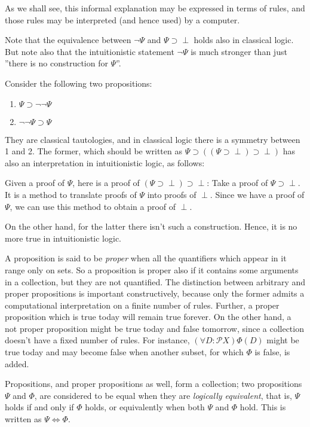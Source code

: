 As we shall see, this informal explanation may be expressed in terms of rules, and those rules may be interpreted (and hence used) by a computer.

Note that the equivalence between $\neg\Psi$ and $\Psi\supset\perp$ holds also in classical logic. But note also that the intuitionistic statement $\neg\Psi$ is much stronger than just ''there is no construction for $\Psi$''.
\begin{example}
	Consider the following two propositions:
	\begin{enumerate}
		\item $\Psi\supset\neg\neg\Psi$
		\item $\neg\neg\Psi\supset\Psi$
	\end{enumerate}
	They are classical tautologies, and in classical logic there is a symmetry between 1 and 2. The former, which should be written as $\Psi\supset((\Psi\supset\perp)\supset\perp)$ has also an interpretation in intuitionistic logic, as follows:
	\begin{center}
		Given a proof of $\Psi$, here is a proof of $(\Psi\supset\perp)\supset\perp$: Take a proof of $\Psi\supset\perp$. It is a method to translate proofs of $\Psi$ into proofs of $\perp$. Since we have a proof of $\Psi$, we can use this method to obtain a proof of $\perp$.
	\end{center}
	On the other hand, for the latter there isn't such a construction. Hence, it is no more true in intuitionistic logic.
\end{example}


A proposition is said to be \textit{proper} when all the quantifiers which appear in it range only on sets. So a proposition is proper also if it contains some arguments in a collection, but they are not quantified. The distinction between arbitrary and proper propositions is important constructively, because only the former admits a computational interpretation on a finite number of rules. Further, a proper proposition which is true today will remain true forever. On the other hand, a not proper proposition might be true today and false tomorrow, since a collection doesn't have a fixed number of rules. For instance, $(\forall D : \mathcal{P}X)\Phi(D)$ might be true today and may become false when another subset, for which $\Phi$ is false, is added.

Propositions, and proper propositions as well, form a collection; two propositions $\Psi$ and $\Phi$, are considered to be equal when they are \textit{logically equivalent}, that is, $\Psi$ holds if and only if $\Phi$ holds, or equivalently when both $\Psi$ and $\Phi$ hold. This is written as $\Psi \iff \Phi$. 


